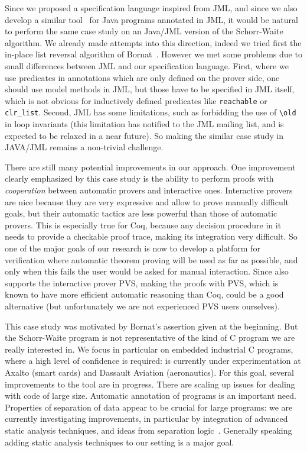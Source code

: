 Since we proposed a specification language inspired from JML, and
since we also develop a similar
tool~\cite{marche04jlap,marche05tphols} for Java programs annotated in
JML, it would be natural to perform the same case study on an Java/JML
version of the Schorr-Waite algorithm. We already made attempts into
this direction, indeed we tried first the in-place list
reversal algorithm of
Bornat~\cite{bornat00mpc,filliatre04icfem}. However we met some 
problems due to small differences between JML and our specification
language. First, where we use predicates in annotations which are only
defined on the prover side, one should use model methods in JML, but
those have to be specified in JML itself, which is not obvious for
inductively defined predicates like \verb|reachable| or \verb|clr_list|.
Second, JML has some limitations, such as forbidding the use of
\verb|\old| in loop invariants (this limitation has notified to the JML 
mailing list, and is expected to be relaxed in a near future). So
making the similar case study in JAVA/JML remains a non-trivial
challenge. 

There are still many potential improvements in our approach. One
improvement clearly emphasized by this case study is the ability to
perform proofs with \emph{cooperation} between automatic provers and
interactive ones. Interactive provers are nice because they are very
expressive and allow to prove manually difficult goals, but their
automatic tactics are less powerful than those of automatic provers. This is
especially true for Coq, because any decision procedure in it needs to
provide a checkable proof trace, making its integration very
difficult. So one of the major goals of our research is now to develop
a platform for verification where automatic theorem proving will be
used as far as possible, and only when this fails the user would be asked
for manual interaction. Since \caduceus{} also supports the interactive
prover PVS, making the proofs with PVS, which is known to have more
efficient automatic reasoning than Coq, could be a good alternative
(but unfortunately we are not experienced PVS users ourselves).

This case study was motivated by Bornat's assertion given at the
beginning. But the Schorr-Waite program is not representative of the
kind of C program we are really interested in. We focus in particular
on embedded industrial C programs, where a high level of confidence is
required: \caduceus{} is currently under experimentation at Axalto
(smart cards) and Dassault Aviation (aeronautics). For this goal,
several improvements to the \caduceus{} tool are in progress. There
are scaling up issues for dealing with code of large size. Automatic
annotation of programs is an important need. Properties of separation
of data appear to be crucial for large programs: we are currently
investigating improvements, in particular by integration of advanced
static analysis techniques, and ideas from separation
logic~\cite{reynolds02lics}. Generally speaking adding static analysis
techniques to our setting is a major goal.

